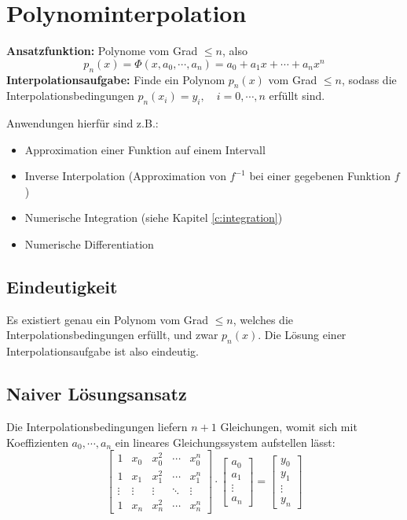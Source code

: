 \section{Polynominterpolation}
	\textbf{Ansatzfunktion:} Polynome vom Grad \( \leq n \), also
	\begin{equation*}
		p_n(x) = \Phi(x, a_0, \cdots, a_n) = a_0 + a_1 x + \cdots + a_n x^n
	\end{equation*}
	\textbf{Interpolationsaufgabe:} Finde ein Polynom \( p_n(x) \) vom Grad \( \leq n \), sodass die Interpolationsbedingungen \( p_n(x_i) = y_i, \quad i = 0, \cdots, n \) erfüllt sind.

	Anwendungen hierfür sind z.B.:
	\begin{itemize}
		\item Approximation einer Funktion auf einem Intervall
		\item Inverse Interpolation (Approximation von \(f^{-1}\) bei einer gegebenen Funktion \(f\))
		\item Numerische Integration (siehe Kapitel \ref{c:integration})
		\item Numerische Differentiation
	\end{itemize}

	\subsection{Eindeutigkeit}
		Es existiert genau ein Polynom vom Grad \( \leq n \), welches die Interpolationsbedingungen erfüllt, und zwar \(p_n(x)\). Die Lösung einer Interpolationsaufgabe ist also eindeutig.

	\subsection{Naiver Lösungsansatz}
		Die Interpolationsbedingungen liefern \( n + 1 \) Gleichungen, womit sich mit Koeffizienten \( a_0, \cdots, a_n \) ein lineares Gleichungssystem aufstellen lässt:
		\begin{equation*}
			\begin{bmatrix}
				1      & x_0    & x_0^2  & \cdots & x_0^n  \\
				1      & x_1    & x_1^2  & \cdots & x_1^n  \\
				\vdots & \vdots & \vdots & \ddots & \vdots \\
				1      & x_n    & x_n^2  & \cdots & x_n^n
			\end{bmatrix}
			\cdot
			\begin{bmatrix}
				a_0    \\
				a_1    \\
				\vdots \\
				a_n
			\end{bmatrix}
			=
			\begin{bmatrix}
				y_0    \\
				y_1    \\
				\vdots \\
				y_n
			\end{bmatrix}
		\end{equation*}

